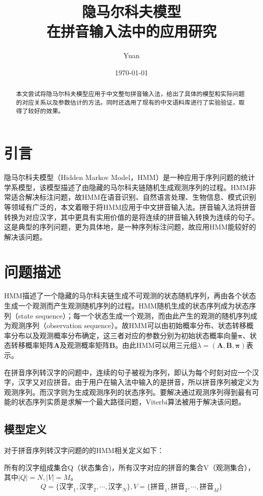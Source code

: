 \documentclass[12pt,a4paper]{ctexart}
\title{隐马尔科夫模型 \\
	在拼音输入法中的应用研究}
\author{Yuan}
\date{\small\today}
\begin{document}
\maketitle
\begin{abstract}
本文尝试将隐马尔科夫模型应用于中文整句拼音输入法，给出了具体的模型和实际问题的对应关系以及参数估计的方法。同时还选用了现有的中文语料库进行了实验验证，取得了较好的效果。
\end{abstract}	
\section{引言}
隐马尔科夫模型（Hidden Markov Model，HMM）是一种应用于序列问题的统计学系模型，该模型描述了由隐藏的马尔科夫链随机生成观测序列的过程。HMM非常适合解决标注问题，故HMM在语音识别、自然语言处理、生物信息、模式识别等领域有广泛的\cite{李航统计学习}，本文着眼于将HMM应用于中文拼音输入法。拼音输入法将拼音转换为对应汉字，其中更具有实用价值的是将连续的拼音输入转换为连续的句子。这是典型的序列问题，更为具体地，是一种序列标注问题，故应用HMM能较好的解决该问题。
\section{问题描述}
HMM描述了一个隐藏的马尔科夫链生成不可观测的状态随机序列，再由各个状态生成一个观测而产生观测随机序列的过程。HMM随机生成的状态序列成为状态序列（state sequence）；每一个状态生成一个观测，而由此产生的观测的随机序列成为观测序列（observation sequence）。故HMM可以由初始概率分布、状态转移概率分布以及观测概率分布确定，这三者对应的参数分别为初始状态概率向量$ \bm{\pi} $、状态转移概率矩阵$\bm{A}$及观测概率矩阵$\bm{B}$。由此HMM可以用三元组$ \lambda=(\bm{A},\bm{B},\bm{\pi}) $表示\cite{李航统计学习}。

在拼音序列转汉字的问题中，连续的句子被视为序列，即认为每个时刻对应一个汉字，汉字又对应拼音。由于用户在输入法中输入的是拼音，所以拼音序列被定义为观测序列。而汉字则为生成观测序列的状态序列。要解决通过观测序列得到最有可能的状态序列实质是求解一个最大路径问题，Viterbi算法\cite{viterbi2006a}被用于解决该问题。
\subsection{模型定义}
对于拼音序列转汉字问题的的HMM相关定义如下：


所有的汉字组成集合Q（状态集合)，所有汉字对应的拼音的集合V（观测集合），其中$ |Q|=N, |V|=M $。
\[ Q=\{ \mbox{汉字}_1,\mbox{汉字}_2,\cdots,\mbox{汉字}_N \},V=\{ \mbox{拼音}_1,\mbox{拼音}_2,\cdots,\mbox{拼音}_M \}  \]
\end{document}
